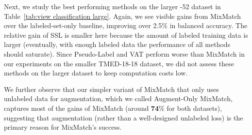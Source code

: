 
Next, we study the best performing methods on the larger -52 dataset in Table~\ref{tab:view classification large}. 
Again, we see visible gains from MixMatch over the labeled-set-only baseline, improving over 2.5\% in balanced accuracy. The relative gain of SSL is smaller here because the amount of labeled training data is larger (eventually, with enough labeled data the performance of all methods should saturate).
Since Pseudo-Label and VAT perform worse than MixMatch in our experiments on the smaller TMED-18-18 dataset, we did not assess these methods on the larger dataset to keep computation costs low.

We further observe that our simpler variant of MixMatch that only uses unlabeled data for augmentation, which we called Augment-Only MixMatch, captures most of the gains of MixMatch (around \textbf{74$\%$} for both datasets), suggesting that augmentation (rather than a well-designed unlabeled loss) is the primary reason for MixMatch's success.


